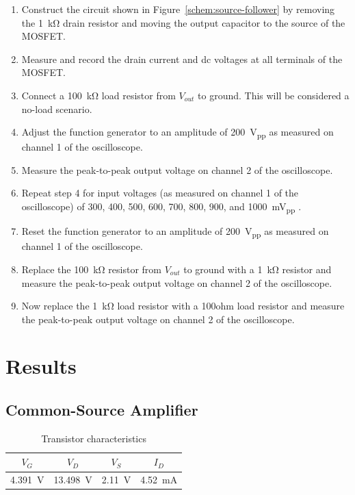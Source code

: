 \begin{enumerate}
\item Construct the circuit shown in Figure~\ref{schem:source-follower} by removing the \SI{1}{\kilo\ohm} drain resistor and moving the output capacitor to the source of the MOSFET.
\item Measure and record the drain current and dc voltages at all terminals of the MOSFET.
\item Connect a \SI{100}{\kilo\ohm} load resistor from $V_{out}$ to ground. This will be considered a no-load scenario.
\item Adjust the function generator to an amplitude of \SI{200}{V_{pp}} as measured on channel 1 of the oscilloscope.
\item Measure the peak-to-peak output voltage on channel 2 of the oscilloscope.
\item Repeat step 4 for input voltages (as measured on channel 1 of the oscilloscope) of 300, 400, 500, 600, 700, 800, 900, and \SI{1000}{mV_{pp}} .
\item Reset the function generator to an amplitude of \SI{200}{V_{pp}} as measured on channel 1 of the oscilloscope.
\item Replace the \SI{100}{\kilo\ohm} resistor from $V_{out}$ to ground with a \SI{1}{\kilo\ohm} resistor and measure the peak-to-peak output voltage on channel 2 of the oscilloscope.
\item Now replace the \SI{1}{\kilo\ohm} load resistor with a 100ohm load resistor and measure the peak-to-peak output voltage on channel 2 of the oscilloscope.
\end{enumerate}

\section{Results}

\subsection{Common-Source Amplifier}

\begin{table}[hbtp]
  \centering
  \begin{tabular}{cccc}
    $V_G$ & $V_D$ & $V_S$ & $I_D$ \\
    \hline
    \SI{4.391}{V} & \SI{13.498}{V} & \SI{2.11}{V} & \SI{4.52}{mA} \\
  \end{tabular}
  \caption{\label{tab:tran_common} Transistor characteristics}
\end{table}


